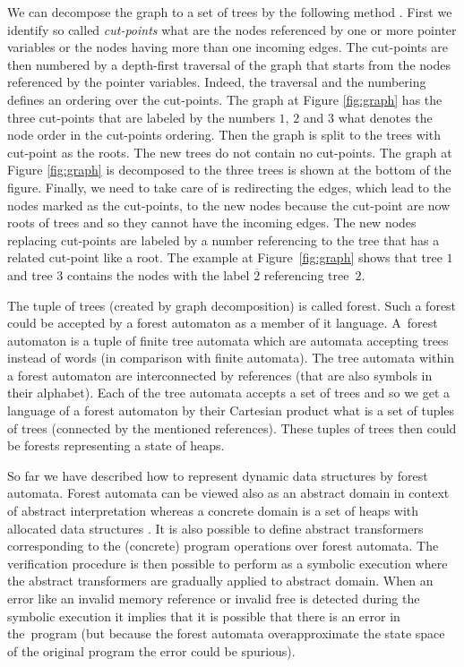 \documentclass[fleqn,11pt]{ExcelAtFIT} %
\begin{document}
We can decompose the graph to a set of trees by the following method \cite{forester11}.
First we identify so called \emph{cut-points} what are the nodes referenced by
one or more pointer variables or the nodes having more than one incoming edges.
The cut-points are then numbered by a depth-first traversal of the graph that starts from
the nodes referenced by the pointer variables.
Indeed, the traversal and the numbering defines an ordering over the cut-points.
The graph at Figure \ref{fig:graph} has the three cut-points that are labeled by the numbers $1$,
$2$ and $3$ what denotes the node order in the cut-points ordering.
Then the graph is split to the trees with cut-point as the roots.
The new trees do not contain no cut-points.
The graph at Figure \ref{fig:graph} is decomposed to the three trees is shown at the bottom of the figure.
Finally, we need to take care of is redirecting the edges, which lead to the nodes
marked as the cut-points, to the new nodes because the cut-point are now roots of trees and
so they cannot have the incoming edges.
The new nodes replacing cut-points are labeled by a number referencing to the tree that has a related cut-point like a root.
The example at Figure~\ref{fig:graph} shows that tree $1$ and tree $3$ contains the nodes with the label $\overline{2}$
referencing tree~$2$.

The tuple of trees (created by graph decomposition) is called forest.
Such a forest could be accepted by a forest automaton as a member of it language.
A~forest automaton is a tuple of finite tree automata which are automata accepting trees instead of words (in comparison with finite automata).
The tree automata within a forest automaton are interconnected by references (that are also symbols in their alphabet).
Each of the tree automata accepts a set of trees and so we get a language of a forest
automaton by their Cartesian product what is a set of tuples of trees (connected by the mentioned references).
These tuples of trees then could be forests representing a state of heaps.

So far we have described how to represent dynamic data structures by forest automata.
Forest automata can be viewed also as an abstract domain in context of abstract interpretation
whereas a concrete domain is a set of heaps with allocated data structures \cite{atva13}.
It is also possible to define abstract transformers corresponding to the (concrete) program operations over forest automata.
The verification procedure is then possible to perform as a symbolic execution
where the abstract transformers are gradually applied to abstract domain.
When an error like an invalid memory reference or invalid free is detected during the symbolic
execution it implies that it is possible that there is an error in the~program (but because
the forest automata overapproximate the state space of the original program the error could be spurious).
\end{document}
